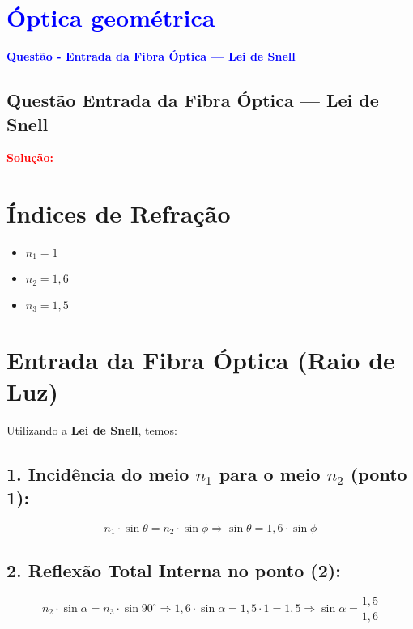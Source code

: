 \section{\large \textcolor{blue}{Óptica geométrica}}

\begin{flushleft}
\textbf{\textcolor{blue}{\Large Quest\~ao - Entrada da Fibra Óptica — Lei de Snell}}\\
\noindent

\subsection{Quest\~ao Entrada da Fibra Óptica — Lei de Snell}

\vspace{0.5cm}

\textcolor{red}{\textbf{Solução:}}\\

\section*{Índices de Refração}

\begin{itemize}
    \item $n_1 = 1$
    \item $n_2 = 1{,}6$
    \item $n_3 = 1{,}5$
\end{itemize}

\section*{Entrada da Fibra Óptica (Raio de Luz)}

Utilizando a \textbf{Lei de Snell}, temos:

\subsection*{1. Incidência do meio $n_1$ para o meio $n_2$ (ponto 1):}
\[
n_1 \cdot \sin \theta = n_2 \cdot \sin \phi
\Rightarrow \sin \theta = 1{,}6 \cdot \sin \phi
\]

\subsection*{2. Reflexão Total Interna no ponto (2):}
\[
n_2 \cdot \sin \alpha = n_3 \cdot \sin 90^\circ
\Rightarrow 1{,}6 \cdot \sin \alpha = 1{,}5 \cdot 1 = 1{,}5
\Rightarrow \sin \alpha = \frac{1{,}5}{1{,}6}
\]


\end{flushleft}
